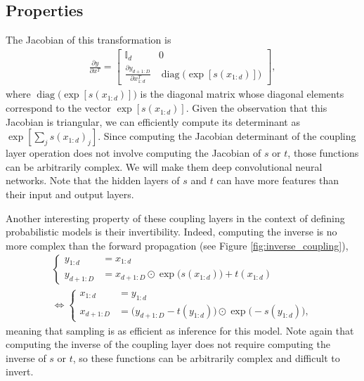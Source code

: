 \documentclass{article}
\newcommand{\jcom}[1]{\textcolor{darkgreen}{[jascha: #1]}}
\newcommand{\ldcom}[1]{\textcolor{blue}{[laurent: #1]}}
\DeclareMathOperator{\diag} {diag}
\def\Id{{\mathbb{I}}}
\begin{document}
\subsection{Properties}
The Jacobian of this transformation is
\begin{align}
\frac{\partial y}{\partial x^T} = \left[\begin{array}{cc}
\Id_{d} & 0 \\
\frac{\partial y_{d+1:D}}{\partial x_{1:d}^T} & \diag\big(\exp\left[s\left(x_{1:d}\right)\right]\big)
\end{array} \right]
,
\end{align}
where $\diag\big(\exp\left[s\left(x_{1:d}\right)\right]\big)$ is the diagonal matrix whose diagonal elements correspond to the vector $\exp\left[s\left(x_{1:d}\right)\right]$. Given the observation that this Jacobian is triangular, we can efficiently compute its determinant as $\exp\left[\sum_{j}{s\left(x_{1:d}\right)_j}\right]$. Since computing the Jacobian determinant of the coupling layer operation does not involve computing the Jacobian of $s$ or $t$, those functions can be arbitrarily complex. We will make them deep convolutional neural networks. Note that the hidden layers of $s$ and $t$ can have more features than their input and output layers.

Another interesting property of these coupling layers in the context of defining probabilistic models is their invertibility. Indeed, computing the inverse is no more complex than the forward propagation (see Figure \ref{fig:inverse_coupling}),
\begin{align}
\begin{cases}
y_{1:d} &= x_{1:d} \\
y_{d+1:D} &= x_{d+1:D} \odot \exp\big(s(x_{1:d})\big) + t(x_{1:d})
\end{cases}\\
\Leftrightarrow
\begin{cases}
x_{1:d} &= y_{1:d} \\
x_{d+1:D} &= \big(y_{d+1:D} - t(y_{1:d})\big) \odot \exp\big(-s(y_{1:d})\big),
\end{cases}
\end{align}
meaning that sampling is as efficient as inference for this model.
Note again that computing the inverse of the coupling layer does not require computing the inverse of $s$ or $t$, so these functions can be arbitrarily complex and difficult to invert.
\end{document}
